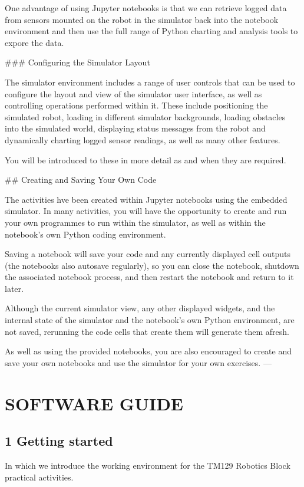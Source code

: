 \documentclass[letterpaper,10pt,english]{sphinxmanual}
\begin{document}
One advantage of using Jupyter notebooks is that we can retrieve logged data from sensors mounted on the robot in the simulator back into the notebook environment and then use the full range of Python charting and analysis tools to expore the data.


### Configuring the Simulator Layout

The simulator environment includes a range of user controls that can be used to configure the layout and view of the simulator user interface, as well as controlling operations performed within it. These include positioning the simulated robot, loading in different simulator backgrounds, loading obstacles into the simulated world, displaying status messages from the robot and dynamically charting logged sensor readings, as well as many other features.

You will be introduced to these in more detail as and when they are required.


## Creating and Saving Your Own Code

The activities hve been created within Jupyter notebooks using the embedded simulator. In many activities, you will have the opportunity to create and run your own programmes to run within the simulator, as well as within the notebook's own Python coding environment.

Saving a notebook will save your code and any currently displayed cell outputs (the notebooks also autosave regularly), so you can close the notebook, shutdown the associated notebook process, and then restart the notebook and return to it later.

Although the current simulator view, any other displayed widgets, and the internal state of the simulator and the notebook's own Python environment, are not saved, rerunning the code cells that create them will generate them afresh.

As well as using the provided notebooks, you are also encouraged to create and save your own notebooks and use the simulator for your own exercises.
---


\section{SOFTWARE GUIDE}
\label{\detokenize{index:software-guide}}

\subsection{1 Getting started}
\label{\detokenize{content/00_SOFTWARE_GUIDE/Section_00_01_Jupyter_environment:1-Getting-started}}\label{\detokenize{content/00_SOFTWARE_GUIDE/Section_00_01_Jupyter_environment::doc}}
In which we introduce the working environment for the TM129 Robotics Block practical activities.
\end{document}
